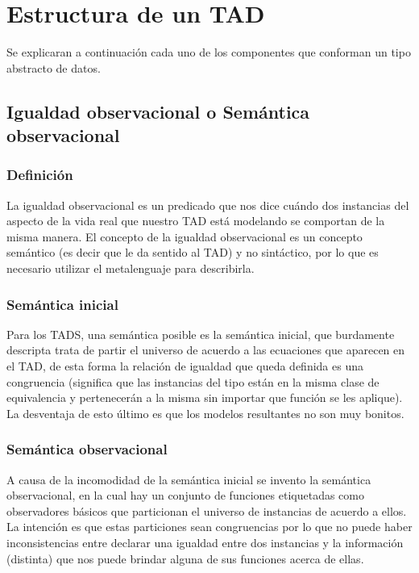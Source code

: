 \newpage
\section{Estructura de un TAD}
Se explicaran a continuaci\'on cada uno de los componentes que conforman un tipo abstracto de datos.


\subsection{Igualdad observacional o Sem\'antica observacional}
\subsubsection*{Definici\'on}
La igualdad observacional es un predicado que nos dice cu\'ando dos instancias del aspecto de la vida real que nuestro TAD est\'a modelando se comportan de la misma manera. El concepto de la igualdad observacional es un concepto sem\'antico (es decir que le da sentido al TAD) y no sint\'actico, por lo que es necesario utilizar el metalenguaje para describirla.

\subsubsection*{Sem\'antica inicial}
Para los TADS, una sem\'antica posible es la sem\'antica inicial, que burdamente descripta trata de partir el universo de acuerdo a las ecuaciones que aparecen en el TAD, de esta forma la relaci\'on de igualdad que queda definida es una congruencia (significa que las instancias del tipo est\'an en la misma clase de equivalencia y pertenecer\'an a la misma sin importar que funci\'on se les aplique). La desventaja de esto \'ultimo es que los modelos resultantes no son muy bonitos. 

\subsubsection*{Sem\'antica observacional}
A causa de la incomodidad de la sem\'antica inicial se invento la sem\'antica observacional, en la cual hay un conjunto de funciones etiquetadas como observadores b\'asicos que particionan el universo de instancias de acuerdo a ellos. La intenci\'on es que estas particiones sean congruencias por lo que no puede haber inconsistencias entre declarar una igualdad entre dos instancias y la informaci\'on (distinta) que nos puede brindar alguna de sus funciones acerca de ellas.

